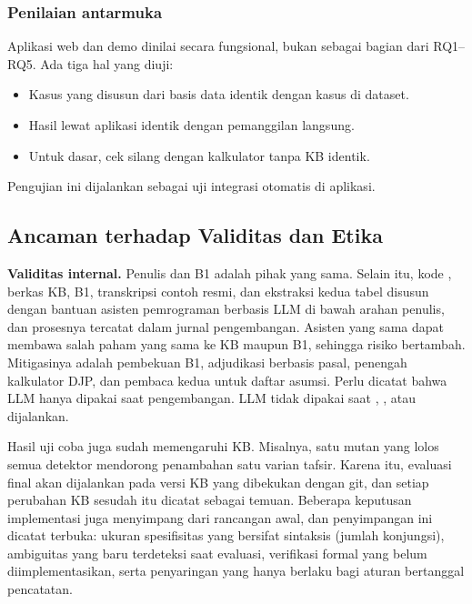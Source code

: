 \subsubsection{Penilaian antarmuka}
Aplikasi web dan demo dinilai secara fungsional, bukan sebagai bagian dari RQ1--RQ5. Ada tiga hal yang diuji:
\begin{itemize}[leftmargin=*,nosep]
  \item Kasus yang disusun dari basis data identik dengan kasus di dataset.
  \item Hasil lewat aplikasi identik dengan pemanggilan  langsung.
  \item Untuk  dasar, cek silang dengan kalkulator tanpa KB identik.
\end{itemize}
Pengujian ini dijalankan sebagai uji integrasi otomatis di  aplikasi.

\subsection{Ancaman terhadap Validitas dan Etika}
\label{subsec:ancaman}

\textbf{Validitas internal.} Penulis  dan B1 adalah pihak yang sama. Selain itu, kode , berkas KB, B1, transkripsi contoh resmi, dan ekstraksi kedua tabel disusun dengan bantuan asisten pemrograman berbasis LLM di bawah arahan penulis, dan prosesnya tercatat dalam jurnal pengembangan. Asisten yang sama dapat membawa salah paham yang sama ke KB maupun B1, sehingga risiko  bertambah. Mitigasinya adalah pembekuan B1, adjudikasi berbasis pasal, penengah kalkulator DJP, dan pembaca kedua untuk daftar asumsi. Perlu dicatat bahwa LLM hanya dipakai saat pengembangan. LLM tidak dipakai saat , , atau  dijalankan.

Hasil uji coba juga sudah memengaruhi KB. Misalnya, satu mutan yang lolos semua detektor mendorong penambahan satu varian tafsir. Karena itu, evaluasi final akan dijalankan pada versi KB yang dibekukan dengan  git, dan setiap perubahan KB sesudah  itu dicatat sebagai temuan. Beberapa keputusan implementasi juga menyimpang dari rancangan awal, dan penyimpangan ini dicatat terbuka: ukuran spesifisitas yang bersifat sintaksis (jumlah konjungsi), ambiguitas yang baru terdeteksi saat evaluasi, verifikasi formal yang belum diimplementasikan, serta penyaringan  yang hanya berlaku bagi aturan bertanggal pencatatan.

